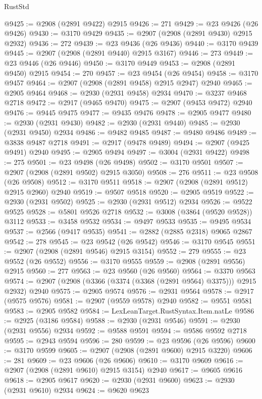 \begin{lexlean}{RustStd}
\begin{coremodule}
@9425 := @2908 (@2891 @9422) @2915
@9426 := 271
@9429 := @23 @9426 (@26 @9426)
@9430 := @3170 @9429
@9435 := @2907 (@2908 (@2891 @9430) @2915 @2932)
@9436 := 272
@9439 := @23 @9436 (@26 @9436)
@9440 := @3170 @9439
@9445 := @2907 (@2908 (@2891 @9440) @2915 @3167)
@9446 := 273
@9449 := @23 @9446 (@26 @9446)
@9450 := @3170 @9449
@9453 := @2908 (@2891 @9450) @2915
@9454 := 270
@9457 := @23 @9454 (@26 @9454)
@9458 := @3170 @9457
@9464 := @2907 (@2908 (@2891 @9458) @2915 @2947) @2940
@9465 := @2905 @9464
@9468 := @2930 (@2931 @9458) @2934
@9470 := @3237 @9468 @2718
@9472 := @2917 (@9465 @9470)
@9475 := @2907 (@9453 @9472) @2940
@9476 := @9445 @9475
@9477 := @9435 @9476
@9478 := @2905 @9477
@9480 := @2930 (@2931 @9430)
@9482 := @2930 (@2931 @9440)
@9485 := @2930 (@2931 @9450) @2934
@9486 := @9482 @9485
@9487 := @9480 @9486
@9489 := @3838 @9487 @2718
@9491 := @2917 (@9478 @9489)
@9494 := @2907 (@9425 @9491) @2940
@9495 := @2905 @9494
@9497 := @3004 (@2931 @9422)
@9498 := 275
@9501 := @23 @9498 (@26 @9498)
@9502 := @3170 @9501
@9507 := @2907 (@2908 (@2891 @9502) @2915 @3050)
@9508 := 276
@9511 := @23 @9508 (@26 @9508)
@9512 := @3170 @9511
@9518 := @2907 (@2908 (@2891 @9512) @2915 @2960) @2940
@9519 := @9507 @9518
@9520 := @2905 @9519
@9522 := @2930 (@2931 @9502)
@9525 := @2930 (@2931 @9512) @2934
@9526 := @9522 @9525
@9528 := @5801 @9526 @2718
@9532 := @3008 (@3864 (@9520 @9528)) @3112
@9533 := @3458 @9532
@9534 := @9497 @9533
@9535 := @9495 @9534
@9537 := @2566 (@9417 @9535)
@9541 := @2882 (@2885 @2318) @9065 @2867
@9542 := 278
@9545 := @23 @9542 (@26 @9542)
@9546 := @3170 @9545
@9551 := @2907 (@2908 (@2891 @9546) @2915 @3154)
@9552 := 279
@9555 := @23 @9552 (@26 @9552)
@9556 := @3170 @9555
@9559 := @2908 (@2891 @9556) @2915
@9560 := 277
@9563 := @23 @9560 (@26 @9560)
@9564 := @3370 @9563
@9574 := @2907 (@2908 (@3366 (@3374 (@3368 (@2891 @9564) @3375))) @2915 @2932) @2940
@9575 := @2905 @9574
@9576 := @2931 @9564
@9578 := @2917 (@9575 @9576)
@9581 := @2907 (@9559 @9578) @2940
@9582 := @9551 @9581
@9583 := @2905 @9582
@9584 := LexLeanTarget.RustSyntax.Item.natLe
@9586 := @2925 (@3186 @9584)
@9588 := @2930 (@2931 @9546)
@9591 := @2930 (@2931 @9556) @2934
@9592 := @9588 @9591
@9594 := @9586 @9592 @2718
@9595 := @2943 @9594
@9596 := 280
@9599 := @23 @9596 (@26 @9596)
@9600 := @3170 @9599
@9605 := @2907 (@2908 (@2891 @9600) @2915 @3220)
@9606 := 281
@9609 := @23 @9606 (@26 @9606)
@9610 := @3170 @9609
@9616 := @2907 (@2908 (@2891 @9610) @2915 @3154) @2940
@9617 := @9605 @9616
@9618 := @2905 @9617
@9620 := @2930 (@2931 @9600)
@9623 := @2930 (@2931 @9610) @2934
@9624 := @9620 @9623

\end{coremodule}
\end{lexlean}

